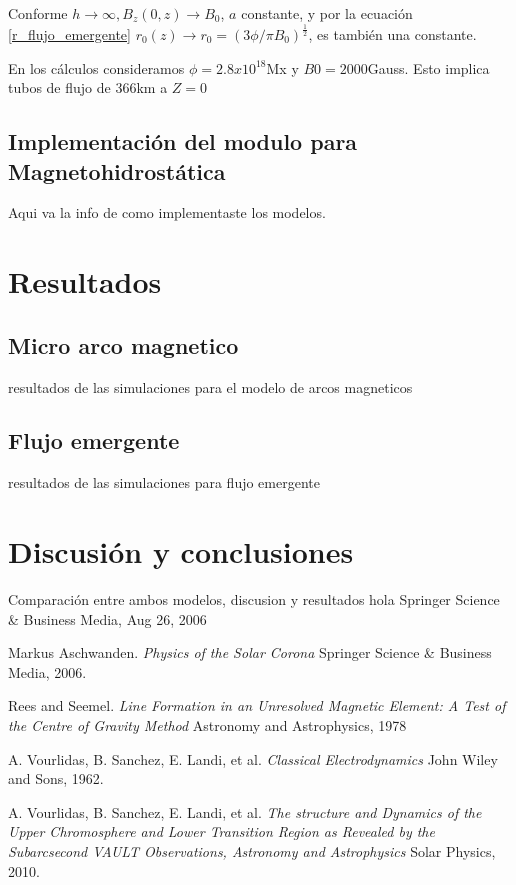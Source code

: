 \documentclass[9pt]{book}
\begin{document}
Conforme $h\rightarrow \infty , B_z(0,z) \rightarrow B_0$, $a$ constante, y por la ecuaci\'on \ref{r_flujo_emergente} $r_0(z) \rightarrow r_0 = (3\phi / \pi B_0)^\frac{1}{2}$, es tambi\'en una constante.

En los c\'alculos consideramos $\phi=2.8x10^18$Mx y $B0=2000$Gauss. Esto implica tubos de flujo de 366km a $Z=0$


\section{Implementaci\'on del modulo para Magnetohidrost\'atica}
Aqui va la info de como implementaste los modelos.


\chapter{Resultados}
\section{Micro arco magnetico}
resultados de las simulaciones para el modelo de arcos magneticos
\section{Flujo emergente}
resultados de las simulaciones para flujo emergente


\chapter{Discusi\'on y conclusiones}
Comparaci\'on entre ambos modelos, discusion y resultados
hola Springer Science \& Business Media, Aug 26, 2006

\begin{thebibliography}{9}

Markus Aschwanden. 
\textit{Physics of the Solar Corona} 
Springer Science \& Business Media, 2006.

Rees and Seemel.
\textit{Line Formation in an Unresolved Magnetic Element: A Test of the Centre of Gravity Method} 
Astronomy and Astrophysics, 1978

A. Vourlidas, B. Sanchez, E. Landi, et al.
\textit{Classical Electrodynamics} 
John Wiley and Sons, 1962.

A. Vourlidas, B. Sanchez, E. Landi, et al.
\textit{The structure and Dynamics of the Upper Chromosphere and Lower Transition Region as Revealed by the Subarcsecond VAULT Observations, Astronomy and Astrophysics} 
Solar Physics, 2010.


\end{thebibliography}
\end{document}
